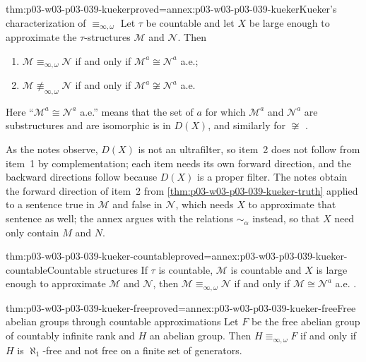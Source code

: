 \begin{hbtheorem}{thm:p03-w03-p03-039-kueker}{proved=annex:p03-w03-p03-039-kueker}{Kueker's characterization of \(\equiv_{\infty,\omega}\)}
Let \(\tau\) be countable and let \(X\) be large enough to approximate the
\(\tau\)-structures \(\mathcal M\) and \(\mathcal N\). Then
\begin{enumerate}
\item \(\mathcal M\equiv_{\infty,\omega}\mathcal N\) if and only if
      \(\mathcal M^a\cong\mathcal N^a\) a.e.;
\item \(\mathcal M\not\equiv_{\infty,\omega}\mathcal N\) if and only if
      \(\mathcal M^a\not\cong\mathcal N^a\) a.e.
\end{enumerate}
Here ``\(\mathcal M^a\cong\mathcal N^a\) a.e.'' means that the set of \(a\)
for which \(\mathcal M^a\) and \(\mathcal N^a\) are substructures and are
isomorphic is in \(D(X)\), and similarly for \(\not\cong\)
\cite[Thm.~2.46 and Ex.~2.47, pp.~25--26]{Marker2014InfinitaryNotes}.
\end{hbtheorem}

As the notes observe, \(D(X)\) is not an ultrafilter, so item~2 does not
follow from item~1 by complementation; each item needs its own forward
direction, and the backward directions follow because \(D(X)\) is a proper
filter. The notes obtain the forward direction of item~2 from
\cref{thm:p03-w03-p03-039-kueker-truth} applied to a sentence true in
\(\mathcal M\) and false in \(\mathcal N\), which needs \(X\) to approximate
that sentence as well; the annex argues with the relations \(\sim_\alpha\)
instead, so that \(X\) need only contain \(M\) and \(N\).

\begin{hbcorollary}{thm:p03-w03-p03-039-kueker-countable}{proved=annex:p03-w03-p03-039-kueker-countable}{Countable structures}
If \(\tau\) is countable, \(\mathcal M\) is countable and \(X\) is large
enough to approximate \(\mathcal M\) and \(\mathcal N\), then
\(\mathcal M\equiv_{\infty,\omega}\mathcal N\) if and only if
\(\mathcal M\cong\mathcal N^a\) a.e.
\cite[Cor.~2.48, p.~26]{Marker2014InfinitaryNotes}.
\end{hbcorollary}

\begin{hbcorollary}{thm:p03-w03-p03-039-kueker-free}{proved=annex:p03-w03-p03-039-kueker-free}{Free abelian groups through countable approximations}
Let \(F\) be the free abelian group of countably infinite rank and \(H\) an
abelian group. Then \(H\equiv_{\infty,\omega}F\) if and only if \(H\) is
\(\aleph_1\)-free and not free on a finite set of generators.
\end{hbcorollary}

